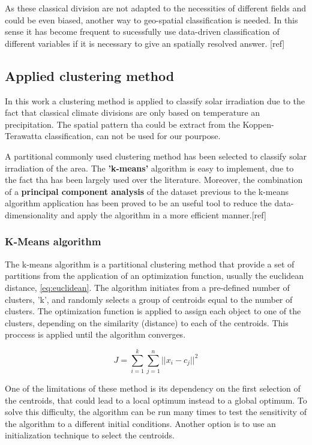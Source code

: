 
As these classical division are not adapted to the necessities of different fields and could be even biased, another way to geo-spatial classification is needed. In this sense it has become frequent to sucessfully use data-driven classification of different variables if it is necessary to give an spatially resolved answer. [ref]

\subsection{Applied clustering method}

In this work a clustering method is applied to classify solar irradiation due to the fact that classical climate divisions are only based on temperature an precipitation. The spatial pattern tha could be extract from the Koppen-Terawatta classification, can not be used for our pourpose.

A partitional commonly used clustering method has been selected to classify solar irradiation of the area. The \textbf{'k-means'} algorithm is easy to implement, due to the fact tha has been largely used over the literature. Moreover, the combination of a \textbf{principal component analysis} of the dataset previous to the k-means algorithm application has been proved to be an useful tool to reduce the data-dimensionality and apply the algorithm in a more efficient manner.[ref]

\subsubsection{K-Means algorithm}

The k-means algorithm is a partitional clustering method that provide a set of partitions from the application of an optimization function, usually the euclidean distance, \ref{eq:euclidean}. The algorithm initiates from a pre-defined number of clusters, 'k', and randomly selects a group of centroids equal to the number of clusters. The optimization function is applied to assign each object to one of the clusters, depending on the similarity (distance) to each of the centroids. This proccess is applied until the algorithm converges.

\begin{equation}\label{eq:euclidean}
    J =\sum_{i=1}^{k}\sum_{j=1}^{n}{||x_i-c_j||}^2
\end{equation}

One of the limitations of these method is its dependency on the first selection of the centroids, that could lead to a local optimum instead to a global optimum. To solve this difficulty, the algorithm can be run many times to test the sensitivity of the algorithm to a different initial conditions. Another option is to use an initialization technique to select the centroids.

